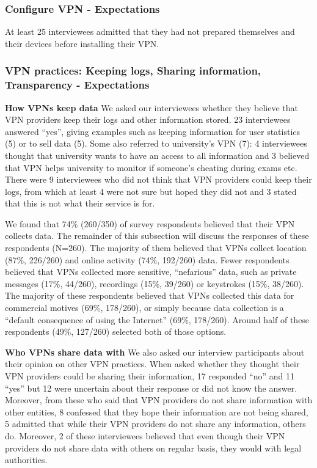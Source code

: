 \subsubsection{Configure VPN - Expectations} At least 25 interviewees admitted
that they had not prepared themselves and their devices before installing
their VPN.

\subsubsection{VPN practices: Keeping logs, Sharing information, Transparency
- Expectations} \textbf{How VPNs keep data} We asked our interviewees whether
they believe that VPN providers keep their logs and other information stored.
23 interviewees answered “yes”, giving examples such as keeping information
for user statistics (5) or to sell data (5). Some also referred to
university’s VPN (7): 4 interviewees thought that university wants to have an
access to all information and 3 believed that VPN helps university to monitor
if someone’s cheating during exams etc. There were 9 interviewees who did not
think that VPN providers could keep their logs, from which at least 4 were not
sure but hoped they did not and 3 stated that this is not what their service
is for.

We found that 74\% (260/350) of survey respondents believed that their VPN
collects data. The remainder of this subsection will discuss the responses of
these respondents (N=260). The majority of them believed that VPNs collect
location (87\%, 226/260) and online activity (74\%, 192/260) data. Fewer
respondents believed that VPNs collected more sensitive, “nefarious” data,
such as private messages (17\%, 44/260), recordings (15\%, 39/260) or
keystrokes (15\%, 38/260). The majority of these respondents believed that
VPNs collected this data for commercial motives (69\%, 178/260), or simply
because data collection is a “default consequence of using the Internet”
(69\%, 178/260). Around half of these respondents (49\%, 127/260) selected
both of those options.

\textbf{Who VPNs share data with} We also asked our interview participants
about their opinion on other VPN practices. When asked whether they thought
their VPN providers could be sharing their information, 17 responded “no” and
11 “yes” but 12 were uncertain about their response or did not know the
answer.  Moreover, from these who said that VPN providers do not share
information with other entities, 8 confessed that they hope their information
are not being shared, 5 admitted that while their VPN providers do not share
any information, others do. Moreover, 2 of these interviewees believed that
even though their VPN providers do not share data with others on regular
basis, they would with legal authorities. 


